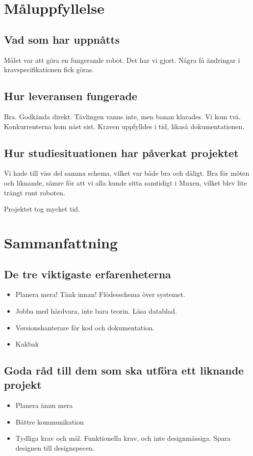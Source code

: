 \documentclass[a4paper,12pt]{article}
\begin{document}
\section{Måluppfyllelse}
\subsection{Vad som har uppnåtts}
Målet var att göra en fungerande robot. Det har vi gjort. Några få ändringar i kravspecifikationen fick göras. 

\subsection{Hur leveransen fungerade}
Bra. Godkända direkt. Tävlingen vanns inte, men banan klarades. Vi kom två. Konkurrenterna kom näst sist. Kraven 
uppfylldes i tid, likaså dokumentationen.  

\subsection{Hur studiesituationen har påverkat projektet}
Vi hade till viss del samma schema, vilket var både bra och dåligt. Bra för möten och liknande, sämre för att vi alla 
kunde sitta samtidigt i Muxen, vilket blev lite trångt runt roboten. 

Projektet tog mycket tid. 

\section{Sammanfattning}
\subsection{De tre viktigaste erfarenheterna}
\begin{itemize}
\item Planera mera! Tänk innan! Flödesschema över systemet.
\item Jobba med hårdvara, inte bara teorin. Läsa datablad. 
\item Versionshanterare för kod och dokumentation. 
\item Kakbak
\end{itemize}

\subsection{Goda råd till dem som ska utföra ett liknande projekt}
\begin{itemize}
\item Planera ännu mera
\item Bättre kommunikation
\item Tydliga krav och mål. Funktionella krav, och inte designmässiga. Spara designen till designspecen. 
\end{itemize}
\end{document}
